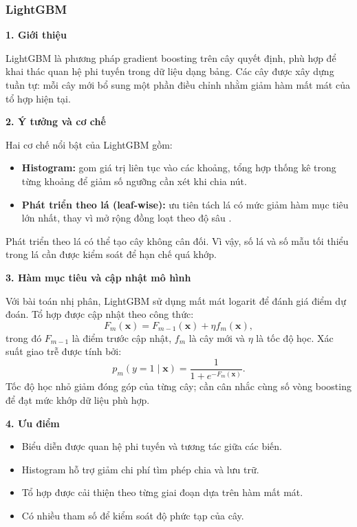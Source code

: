 \documentclass[a4paper]{article}
\begin{document}
\subsubsection{LightGBM}
\noindent\textbf{1. Giới thiệu}\par
LightGBM là phương pháp gradient boosting trên cây quyết định, phù hợp để khai thác quan hệ phi tuyến trong dữ liệu dạng bảng. Các cây được xây dựng tuần tự: mỗi cây mới bổ sung một phần điều chỉnh nhằm giảm hàm mất mát của tổ hợp hiện tại.

\noindent\textbf{2. Ý tưởng và cơ chế}\par
Hai cơ chế nổi bật của LightGBM gồm:
\begin{itemize}
    \item \textbf{Histogram:} gom giá trị liên tục vào các khoảng, tổng hợp thống kê trong từng khoảng để giảm số ngưỡng cần xét khi chia nút.
    \item \textbf{Phát triển theo lá (leaf-wise):} ưu tiên tách lá có mức giảm hàm mục tiêu lớn nhất, thay vì mở rộng đồng loạt theo độ sâu \cite{lightgbmTheory}.
\end{itemize}
Phát triển theo lá có thể tạo cây không cân đối. Vì vậy, số lá và số mẫu tối thiểu trong lá cần được kiểm soát để hạn chế quá khớp.

\noindent\textbf{3. Hàm mục tiêu và cập nhật mô hình}\par
Với bài toán nhị phân, LightGBM sử dụng mất mát logarit để đánh giá điểm dự đoán. Tổ hợp được cập nhật theo công thức:
\[
F_m(\mathbf{x})=F_{m-1}(\mathbf{x})+\eta f_m(\mathbf{x}),
\]
trong đó $F_{m-1}$ là điểm trước cập nhật, $f_m$ là cây mới và $\eta$ là tốc độ học. Xác suất giao trễ được tính bởi:
\[
p_m(y=1\mid\mathbf{x})=\frac{1}{1+e^{-F_m(\mathbf{x})}}.
\]
Tốc độ học nhỏ giảm đóng góp của từng cây; cần cân nhắc cùng số vòng boosting để đạt mức khớp dữ liệu phù hợp.

\noindent\textbf{4. Ưu điểm}\par
\begin{itemize}
    \item Biểu diễn được quan hệ phi tuyến và tương tác giữa các biến.
    \item Histogram hỗ trợ giảm chi phí tìm phép chia và lưu trữ.
    \item Tổ hợp được cải thiện theo từng giai đoạn dựa trên hàm mất mát.
    \item Có nhiều tham số để kiểm soát độ phức tạp của cây.
\end{itemize}
\end{document}
